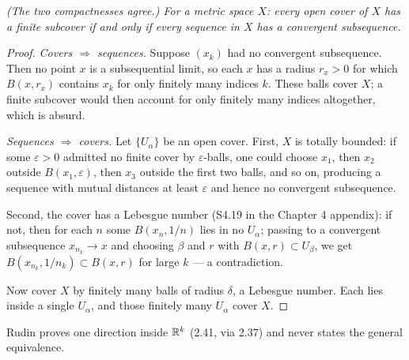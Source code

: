 \emph{(The two compactnesses agree.) For a metric space $X$: every open cover
of $X$ has a finite subcover if and only if every sequence in $X$ has a
convergent subsequence.}
\begin{proof}
\emph{Covers $\Rightarrow$ sequences.} Suppose $(x_k)$ had no convergent
subsequence. Then no point $x$ is a subsequential limit, so each $x$ has a
radius $r_x>0$ for which $B(x,r_x)$ contains $x_k$ for only finitely many
indices $k$. These balls cover $X$; a finite subcover would then account for
only finitely many indices altogether, which is absurd.

\emph{Sequences $\Rightarrow$ covers.} Let $\{U_\alpha\}$ be an open cover.
First, $X$ is totally bounded: if some $\varepsilon>0$ admitted no finite
cover by $\varepsilon$-balls, one could choose $x_1$, then $x_2$ outside
$B(x_1,\varepsilon)$, then $x_3$ outside the first two balls, and so on,
producing a sequence with mutual distances at least $\varepsilon$ and hence
no convergent subsequence.

Second, the cover has a Lebesgue number (S4.19 in the Chapter 4 appendix):
if not, then for each $n$ some $B(x_n,1/n)$ lies in no $U_\alpha$; passing
to a convergent subsequence $x_{n_k} \to x$ and choosing $\beta$ and $r$ with
$B(x,r) \subset U_\beta$, we get $B(x_{n_k},1/n_k) \subset B(x,r)$ for large
$k$ --- a contradiction.

Now cover $X$ by finitely many balls of radius $\delta$, a Lebesgue number.
Each lies inside a single $U_\alpha$, and those finitely many $U_\alpha$
cover $X$.
\end{proof}

\noindent
Rudin proves one direction inside $\mathbb{R}^k$ (2.41, via 2.37) and never states
the general equivalence.


